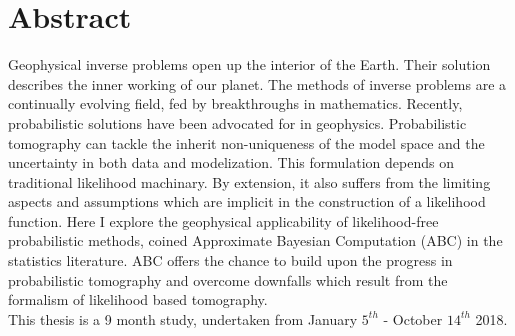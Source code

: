 \chapter{Abstract}

Geophysical inverse problems open up the interior of the Earth. Their solution describes the inner working of our planet. The methods of inverse problems are a continually evolving field, fed by breakthroughs in mathematics. Recently, probabilistic solutions have been advocated for in geophysics. Probabilistic tomography can tackle the inherit non-uniqueness of the model space and the uncertainty in both data and modelization. This formulation depends on traditional likelihood machinary. By extension, it also suffers from the limiting aspects and assumptions which are implicit in the construction of a likelihood function. Here I explore the geophysical applicability of likelihood-free probabilistic methods, coined Approximate Bayesian Computation (ABC) in the statistics literature. ABC offers the chance to build upon the progress in probabilistic tomography and overcome downfalls which result from the formalism of likelihood based tomography. \\

This thesis is a 9 month study, undertaken from January $5^{th}$ - October $14^{th}$ 2018. 

